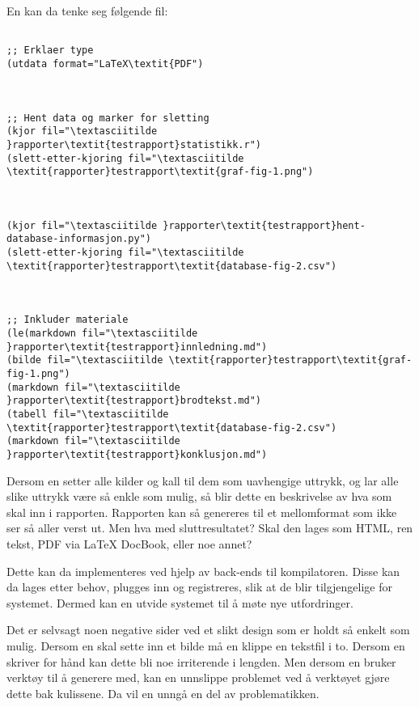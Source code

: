 \documentclass[11pt]{article}
\begin{document}
En kan da tenke seg følgende fil:

\begin{lstlisting}

;; Erklaer type
(utdata format="LaTeX\textit{PDF")



;; Hent data og marker for sletting
(kjor fil="\textasciitilde }rapporter\textit{testrapport}statistikk.r")
(slett-etter-kjoring fil="\textasciitilde \textit{rapporter}testrapport\textit{graf-fig-1.png")



(kjor fil="\textasciitilde }rapporter\textit{testrapport}hent-database-informasjon.py")
(slett-etter-kjoring fil="\textasciitilde \textit{rapporter}testrapport\textit{database-fig-2.csv")



;; Inkluder materiale
(le(markdown fil="\textasciitilde }rapporter\textit{testrapport}innledning.md")
(bilde fil="\textasciitilde \textit{rapporter}testrapport\textit{graf-fig-1.png")
(markdown fil="\textasciitilde }rapporter\textit{testrapport}brodtekst.md")
(tabell fil="\textasciitilde \textit{rapporter}testrapport\textit{database-fig-2.csv")
(markdown fil="\textasciitilde }rapporter\textit{testrapport}konklusjon.md")

\end{lstlisting}




Dersom en setter alle kilder og kall til dem som uavhengige uttrykk, og lar alle slike uttrykk være så enkle som mulig, så blir dette en beskrivelse av hva som skal inn i rapporten. Rapporten kan så genereres til et mellomformat som ikke ser så aller verst ut. Men hva med sluttresultatet? Skal den lages som HTML, ren tekst, PDF via LaTeX DocBook, eller noe annet?



Dette kan da implementeres ved hjelp av back-ends til kompilatoren. Disse kan da lages etter behov, plugges inn og registreres, slik at de blir tilgjengelige for systemet. Dermed kan en utvide systemet til å møte nye utfordringer.



Det er selvsagt noen negative sider ved et slikt design som er holdt så enkelt som mulig. Dersom en skal sette inn et bilde må en klippe en tekstfil i to. Dersom en skriver for hånd kan dette bli noe irriterende i lengden. Men dersom en bruker verktøy til å generere med, kan en unnslippe problemet ved å verktøyet gjøre dette bak kulissene. Da vil en unngå en del av problematikken.
\end{document}
